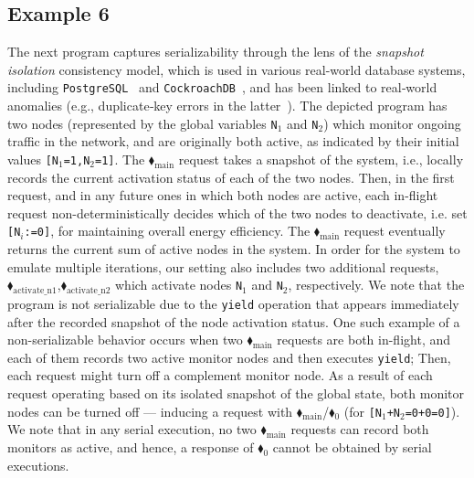 \subsection{Example 6}


The next program captures serializability through the lens of the \textit{snapshot isolation} consistency model, which is used in various real-world database systems, including \texttt{PostgreSQL}~\cite{postgresql-transaction-iso} and \texttt{CockroachDB}~\cite{cockroachdb-si-docs}, and has been linked to real‐world anomalies (e.g., duplicate‐key errors in the latter~\cite{cockroach-issue-14099}).
%
The depicted program has two nodes (represented by the global variables \texttt{N$_1$} and \texttt{N$_2$}) which monitor ongoing traffic in the network, and are originally both active, as indicated by their initial values \texttt{[N$_1$=1,N$_2$=1]}.
%
The {\color{ForestGreen}$\blacklozenge_\text{main}$} request takes a snapshot of the system, i.e., locally records the current activation status of each of the two nodes.
%
Then, in the first request, and in any future ones in which both nodes are active, each in-flight request non-deterministically decides which of the two nodes to deactivate, i.e. set \texttt{[N$_i$:=0]}, for maintaining overall energy efficiency.
%
The {\color{ForestGreen}$\blacklozenge_\text{main}$} request eventually returns the current sum of active nodes in the system.
%
In order for the system to emulate multiple iterations, our setting also includes two additional requests, {\color{ForestGreen}$\blacklozenge_\text{activate\_n1}$},{\color{ForestGreen}$\blacklozenge_\text{activate\_n2}$} which activate nodes \texttt{N$_1$} and \texttt{N$_2$}, respectively.
%
We note that the program is not serializable due to the \texttt{yield} operation that appears immediately after the recorded snapshot of the node activation status. One such example of a non-serializable behavior occurs when two {\color{ForestGreen}$\blacklozenge_\text{main}$} requests are both in-flight, and each of them records two active monitor nodes and then executes \texttt{yield}; Then, each request might turn off a complement monitor node. As a result of each request operating based on its isolated snapshot of the global state, both monitor nodes can be turned off --- inducing a request with {\color{ForestGreen}$\blacklozenge_\text{main}$}/{\color{red}$\blacklozenge_0$} (for \texttt{[N$_1$+N$_2$=0+0=0]}).
%
We note that in any serial execution, no two {\color{ForestGreen}$\blacklozenge_\text{main}$} requests can record both monitors as active, and hence, a response of {\color{red}$\blacklozenge_0$} cannot be obtained by serial executions.




